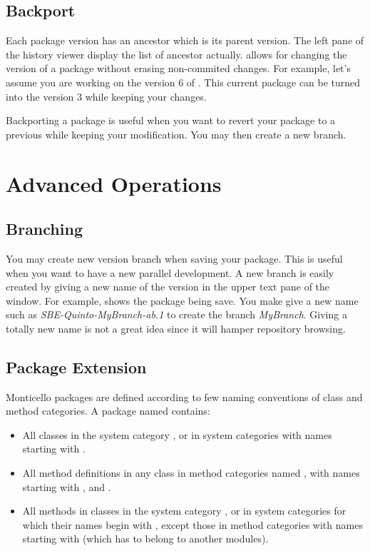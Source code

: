 \documentclass[a4paper,10pt,twoside]{book}
\begin{document}
\subsection{Backport} 

Each package version has an ancestor which is its parent version. The left pane of the history viewer display the list of ancestor actually.  allows for changing the version of a package without erasing non-commited changes. For example, let's assume you are working on the version 6 of . This current package can be turned into the version 3 while keeping your changes. 

Backporting a package is useful when you want to revert your package to a previous while keeping your modification. You may then create a new branch. 



\section{Advanced Operations} 

\subsection{Branching}

You may create new version branch when saving your package. This is useful when you want to have a new parallel development. A new branch is easily created by giving a new name of the version in the upper text pane of the  window. For example,  shows the package  being save. You make give a new name such as \emph{SBE-Quinto-MyBranch-ab.1} to create the branch \emph{MyBranch}. Giving a totally new name is not a great idea since it will hamper repository browsing.

\subsection{Package Extension}  
Monticello packages are defined according to few naming conventions of class and method categories. A package named  contains:

\begin{itemize}
\item All classes in the system category , or in system categories with names starting with .
\item All method definitions in any class in method categories named , with names starting with ,  and .
\item All methods in classes in the system category , or in system categories for which their names begin with , except those in method categories with names starting with \prot{*} (which has to belong to another modules).
\end{itemize}
\end{document}
